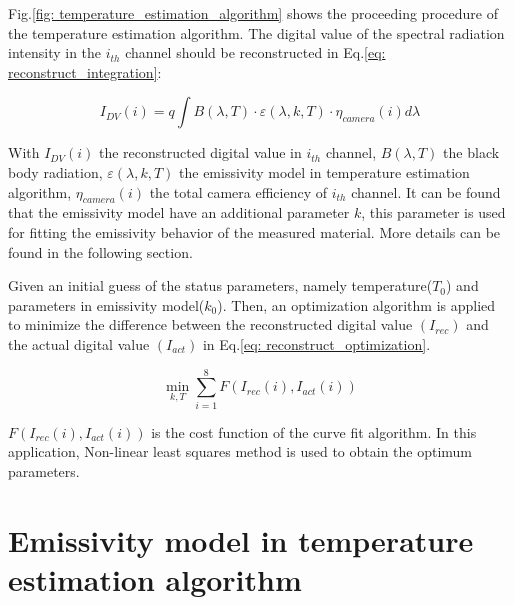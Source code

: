 Fig.\ref{fig: temperature_estimation_algorithm} shows the proceeding procedure of the 
temperature estimation algorithm. The digital value of the spectral radiation intensity 
in the $i_{th}$ channel should be reconstructed in Eq.\ref{eq: reconstruct_integration}:

\begin{equation}
    \label{eq: reconstruct_integration}
    I_{DV}(i) = q \int B(\lambda, T) \cdot \varepsilon(\lambda, k, T) \cdot \eta_{camera}(i) d\lambda
\end{equation}

With $I_{DV}(i)$ the reconstructed digital value in $i_{th}$ channel, $B(\lambda, T)$ the black body radiation, 
$\varepsilon(\lambda, k, T)$ the emissivity model in temperature estimation algorithm, 
$\eta_{camera}(i)$ the total camera efficiency of $i_{th}$ channel. It can be found that 
the emissivity model have an additional parameter $k$, this parameter is used for fitting 
the emissivity behavior of the measured material. More details can be found in the following 
section.

Given an initial guess of the status parameters, namely 
temperature($T_0$) and parameters in emissivity model($k_0$). Then, an optimization 
algorithm is applied to minimize the difference between the reconstructed digital value $(I_{rec})$ 
and the actual digital value $(I_{act})$ in Eq.\ref{eq: reconstruct_optimization}.

\begin{equation}
    \label{eq: reconstruct_optimization}
    \min_{k, T}\sum_{i=1}^{8}  F(I_{rec}(i), I_{act}(i))
\end{equation} 

$F(I_{rec}(i), I_{act}(i))$ is the cost function of the curve fit algorithm. In this 
application, Non-linear least squares method is used to obtain the optimum parameters.



\section{Emissivity model in temperature estimation algorithm}%



%
%
